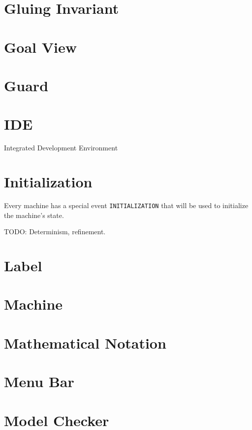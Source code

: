 \section{Gluing Invariant}
\label{gluing_invariant}

\section{Goal View}
\label{goal_view}

\section{Guard}
\label{guard}

\section{IDE}
\label{ide}

Integrated Development Environment

\section{Initialization}
\label{initialization}

Every machine has a special event \texttt{INITIALIZATION} that will be used to initialize the machine's state.

TODO: Determinism, refinement.

\section{Label}
\label{label}

\section{Machine}
\label{machine}

\section{Mathematical Notation}
\label{mathematical_notation}

\section{Menu Bar}
\label{menu_bar}

\section{Model Checker}
\label{model_checker}

